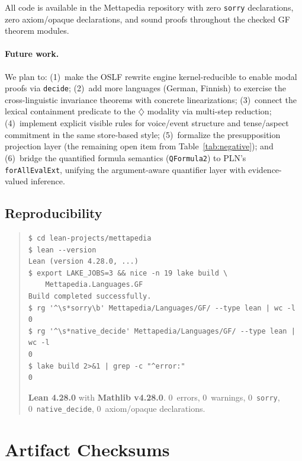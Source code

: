 \documentclass[11pt]{article}
\newcommand{\code}[1]{\texttt{#1}}
\newcommand{\Dia}{\ensuremath{\diamondsuit}}
\newcommand{\OSLF}{\textup{OSLF}}
\newcommand{\GF}{\textup{GF}}
\begin{document}
All code is available in the Mettapedia repository with zero
\code{sorry} declarations, zero axiom/opaque declarations, and sound proofs
throughout the checked \GF{} theorem modules.

\paragraph{Future work.}  We plan to: (1)~make the \OSLF{} rewrite engine
kernel-reducible to enable modal proofs via \code{decide}; (2)~add more
languages (German, Finnish) to exercise the cross-linguistic invariance
theorems with concrete linearizations; (3)~connect the lexical containment
predicate to the $\Dia$ modality via multi-step reduction;
(4)~implement explicit visible rules for voice/event structure and
tense/aspect commitment in the same store-based style;
(5)~formalize the presupposition projection layer (the remaining
open item from Table~\ref{tab:negative}); and
(6)~bridge the quantified formula semantics (\code{QFormula2}) to
PLN's \code{forAllEvalExt}, unifying the argument-aware quantifier
layer with evidence-valued inference.

\subsection*{Reproducibility}

\begin{quote}
\small
\begin{verbatim}
$ cd lean-projects/mettapedia
$ lean --version
Lean (version 4.28.0, ...)
$ export LAKE_JOBS=3 && nice -n 19 lake build \
    Mettapedia.Languages.GF
Build completed successfully.
$ rg '^\s*sorry\b' Mettapedia/Languages/GF/ --type lean | wc -l
0
$ rg '^\s*native_decide' Mettapedia/Languages/GF/ --type lean | wc -l
0
$ lake build 2>&1 | grep -c "^error:"
0
\end{verbatim}

\textbf{Lean 4.28.0} with \textbf{Mathlib v4.28.0}.
0~errors, 0~warnings, 0~\code{sorry},
0~\code{native\_decide}, 0~axiom/opaque declarations.
\end{quote}




\appendix
\section{Artifact Checksums}
\label{app:artifact}
\end{document}
